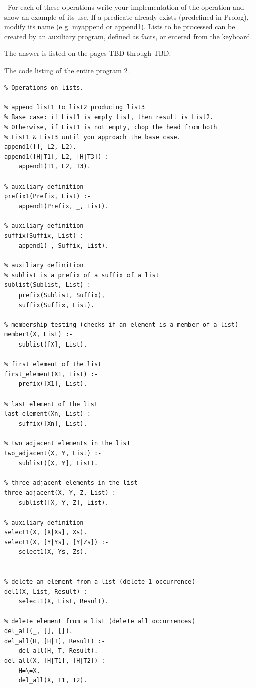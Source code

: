 \documentclass{article}
\begin{document}
	\rmfamily\
	For each of these operations write your implementation of the operation and show an example of its use. If a predicate already exists (predefined in Prolog), modify its name (e.g. myappend or append1).
	Lists to be processed can be created by an auxiliary program, defined as facts, or entered from the keyboard.
	\newline
	
	The answer is listed on the pages TBD through TBD.
	



	
	\noindent The code listing of the entire program 2.
	
	\begin{verbatim}
% Operations on lists.

% append list1 to list2 producing list3
% Base case: if List1 is empty list, then result is List2.
% Otherwise, if List1 is not empty, chop the head from both 
% List1 & List3 until you approach the base case.
append1([], L2, L2).
append1([H|T1], L2, [H|T3]) :-
    append1(T1, L2, T3).

% auxiliary definition
prefix1(Prefix, List) :-
    append1(Prefix, _, List).

% auxiliary definition
suffix(Suffix, List) :-
    append1(_, Suffix, List).

% auxiliary definition
% sublist is a prefix of a suffix of a list
sublist(Sublist, List) :-
    prefix(Sublist, Suffix),
    suffix(Suffix, List).

% membership testing (checks if an element is a member of a list)
member1(X, List) :-
    sublist([X], List).

% first element of the list
first_element(X1, List) :-
    prefix([X1], List).

% last element of the list
last_element(Xn, List) :-
    suffix([Xn], List).

% two adjacent elements in the list
two_adjacent(X, Y, List) :-
    sublist([X, Y], List).

% three adjacent elements in the list
three_adjacent(X, Y, Z, List) :-
    sublist([X, Y, Z], List).

% auxiliary definition
select1(X, [X|Xs], Xs).
select1(X, [Y|Ys], [Y|Zs]) :-
    select1(X, Ys, Zs).


% delete an element from a list (delete 1 occurrence)
del1(X, List, Result) :-
    select1(X, List, Result).

% delete element from a list (delete all occurrences)
del_all(_, [], []).
del_all(H, [H|T], Result) :-
    del_all(H, T, Result).
del_all(X, [H|T1], [H|T2]) :-
    H=\=X,
    del_all(X, T1, T2).



\end{verbatim}
\end{document}

